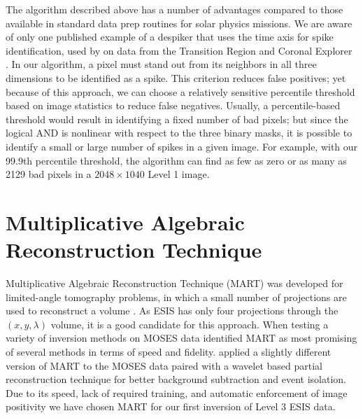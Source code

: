 The algorithm described above has a number of advantages compared to those available in standard data prep routines for solar physics missions. 
We are aware of only one published example of a despiker that uses the time axis for spike identification, used by \citet{Aschwanden2000(trace_unspike_time)} on data from the Transition Region and Coronal Explorer \citep[TRACE]{handy1999}. 
In our algorithm, a pixel must stand out from its neighbors in all three dimensions to be identified as a spike.
This criterion reduces false positives; yet because of this approach, we can choose a relatively sensitive percentile threshold based on image statistics to reduce false negatives. 
Usually, a percentile-based threshold would result in identifying a fixed number of bad pixels; but since the logical AND is nonlinear with respect to the three binary masks, it is possible to identify a small or large number of spikes in a given image. 
For example, with our 99.9th percentile threshold, the algorithm can find as few as zero or as many as 2129 bad pixels in a $2048\times 1040$ Level 1 image. 

\section{Multiplicative Algebraic Reconstruction Technique}\label{MART}
	Multiplicative Algebraic Reconstruction Technique (MART) was developed for limited-angle tomography problems, in which a small number of projections are used to reconstruct a volume \citep{Okamoto1991,Verhoeven1993}. 
	As ESIS has only four projections through the $(x,y,\lambda)$ volume, it is a good candidate for this approach.
	When testing a variety of inversion methods on MOSES data \citet{FoxPhD} identified MART as most promising of several methods in terms of speed and fidelity.
	\citet{RustPhD} applied a slightly different version of MART to the MOSES data paired with a wavelet based partial reconstruction technique for better background subtraction and event isolation.
	Due to its speed, lack of required training, and automatic enforcement of image positivity we have chosen MART for our first inversion of Level 3 ESIS data.

